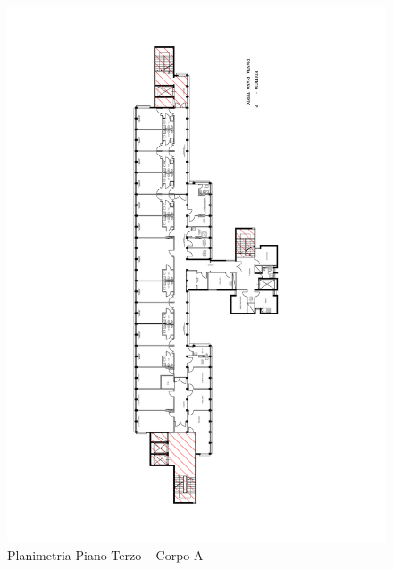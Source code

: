 \begin{figure}
	\centering
	\includegraphics[width=\hsize]{6_2_cap/img/P3}
	\caption{Planimetria Piano Terzo -- Corpo A}
	\label{img:P3}
\end{figure}
